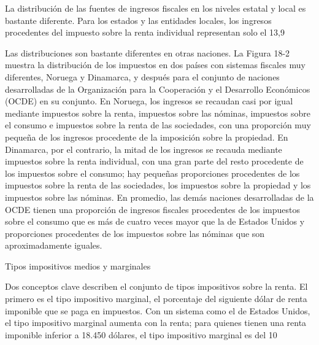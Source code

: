 \documentclass[10pt,a4paper]{article}
\begin{document}
{La distribución de las fuentes de ingresos fiscales en los niveles estatal y local es bastante diferente. Para los estados y las entidades locales, los ingresos procedentes del impuesto sobre la renta individual representan solo el 13,9 %

Las distribuciones son bastante diferentes en otras naciones. La Figura 18-2 muestra la distribución de los impuestos en dos países con sistemas fiscales muy diferentes, Noruega y Dinamarca, y después para el conjunto de naciones desarrolladas de la Organización para la Cooperación y el Desarrollo Económicos (OCDE) en su conjunto. En Noruega, los ingresos se recaudan casi por igual mediante impuestos sobre la renta, impuestos sobre las nóminas, impuestos sobre el consumo e impuestos sobre la renta de las sociedades, con una proporción muy pequeña de los ingresos procedente de la imposición sobre la propiedad. En Dinamarca, por el contrario, la mitad de los ingresos se recauda mediante impuestos sobre la renta individual, con una gran parte del resto procedente de los impuestos sobre el consumo; hay pequeñas proporciones procedentes de los impuestos sobre la renta de las sociedades, los impuestos sobre la propiedad y los impuestos sobre las nóminas. En promedio, las demás naciones desarrolladas de la OCDE tienen una proporción de ingresos fiscales procedentes de los impuestos sobre el consumo que es más de cuatro veces mayor que la de Estados Unidos y proporciones procedentes de los impuestos sobre las nóminas que son aproximadamente iguales.


Tipos impositivos medios y marginales

Dos conceptos clave describen el conjunto de tipos impositivos sobre la renta. El primero es el tipo impositivo marginal, el porcentaje del siguiente dólar de renta imponible que se paga en impuestos. Con un sistema como el de Estados Unidos, el tipo impositivo marginal aumenta con la renta; para quienes tienen una renta imponible inferior a 18.450 dólares, el tipo impositivo marginal es del 10 %

}
\end{document}
